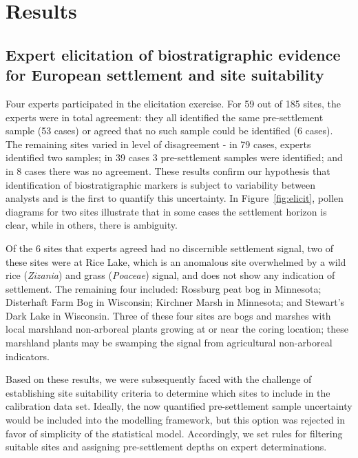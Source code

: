 \documentclass[12pt]{article}
\begin{document}
\section{Results}

\subsection{Expert elicitation of biostratigraphic evidence for European settlement and site suitability}

Four experts participated in the elicitation exercise. For 59 out of
185 sites, the experts were in total agreement: they all identified
the same pre-settlement sample (53 cases) or agreed that no such
sample could be identified (6 cases). The remaining sites varied in
level of disagreement - in 79 cases, experts identified two samples;
in 39 cases 3 pre-settlement samples were identified; and in 8 cases
there was no agreement. These results confirm our hypothesis that
identification of biostratigraphic markers is subject to variability
between analysts and is the first to quantify this uncertainty. In
Figure~\ref{fig:elicit}, pollen diagrams for two sites illustrate that
in some cases the settlement horizon is clear, while in others, there
is ambiguity.

Of the 6 sites that experts agreed had no discernible settlement
signal, two of these sites were at Rice Lake, which is an anomalous
site overwhelmed by a wild rice (\textit{Zizania}) and grass
(\textit{Poaceae}) signal, and does not show any indication of
settlement. The remaining four included: Rossburg peat bog in
Minnesota; Disterhaft Farm Bog in Wisconsin; Kirchner Marsh in
Minnesota; and Stewart’s Dark Lake in Wisconsin. Three of these four
sites are bogs and marshes with local marshland non-arboreal plants
growing at or near the coring location; these marshland plants may be
swamping the signal from agricultural non-arboreal indicators.

Based on these results, we were subsequently faced with the challenge
of establishing site suitability criteria to determine which sites to
include in the calibration data set. Ideally, the now quantified
pre-settlement sample uncertainty would be included into the modelling
framework, but this option was rejected in favor of simplicity of the
statistical model. Accordingly, we set rules for filtering suitable
sites and assigning pre-settlement depths on expert determinations.

\end{document}
